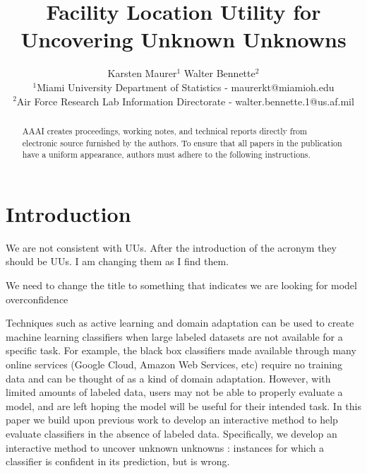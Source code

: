 \documentclass[letterpaper]{article} %
\newcommand{\wdb}[1]{{\color{blue} #1}} %
\begin{document}
%
\title{Facility Location Utility for Uncovering Unknown Unknowns}
\author{Karsten Maurer$^1$ \hspace{.2in} Walter Bennette$^2$\\
$^1$Miami University Department of Statistics - maurerkt@miamioh.edu\\ 
$^2$Air Force Research Lab Information Directorate - walter.bennette.1@us.af.mil \\
}

\maketitle
\begin{abstract}
AAAI creates proceedings, working notes, and technical reports directly from electronic source furnished by the authors. To ensure that all papers in the publication have a uniform appearance, authors must adhere to the following instructions. 
\end{abstract}

\section{Introduction}

\wdb{We are not consistent with UUs.  After the introduction of the acronym they should be UUs.  I am changing them as I find them.}

\wdb{We need to change the title to something that indicates we are looking for model overconfidence}

Techniques such as active learning \citep{Settles2010} and domain adaptation \citep{Patel2014} can be used to create machine learning classifiers when large labeled datasets are not available for a specific task.  For example, the black box classifiers made available through many online services \wdb{(Google Cloud, Amazon Web Services, etc)} require no training data and can be thought of as a kind of domain adaptation.  However, with limited amounts of labeled data, users may not be able to properly evaluate a model, and are left hoping the model will be useful for their intended task.  In this paper we build upon previous work to develop an interactive method to help evaluate classifiers in the absence of labeled data.  Specifically, we develop an interactive method to uncover unknown unknowns \citep{Attenberg2015}: instances for which a classifier is confident in its prediction, but is wrong.  
\end{document}
